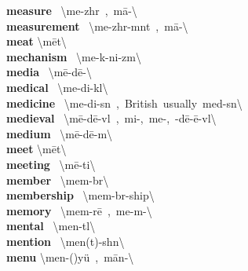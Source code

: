 \documentclass[10pt,a4paper]{article}
\begin{document}
\begin{multicols}{2}
\textbf{ measure }\quad \ \textbackslash \textprimstress me-zh\textschwa r\ ,\ \textprimstress m\={a}-\textbackslash \\
\textbf{ measurement }\quad \ \textbackslash \textprimstress me-zh\textschwa r-m\textschwa nt\ ,\ \textprimstress m\={a}-\textbackslash \\
\textbf{ meat }\quad \textbackslash \textprimstress m\={e}t\textbackslash \\
\textbf{ mechanism }\quad \ \textbackslash \textprimstress me-k\textschwa -\textsecstress ni-z\textschwa m\textbackslash \\
\textbf{ media }\quad \ \textbackslash \textprimstress m\={e}-d\={e}-\textschwa \textbackslash \\
\textbf{ medical }\quad \ \textbackslash \textprimstress me-di-k\textschwa l\textbackslash \\
\textbf{ medicine }\quad \ \textbackslash \textprimstress me-di-s\textschwa n\ ,\ British\ usually\ \textprimstress med-s\textschwa n\textbackslash \\
\textbf{ medieval }\quad \ \textbackslash \textsecstress m\={e}-\textprimstress d\={e}-v\textschwa l\ ,\ mi-,\ \textsecstress me-,\ -d\={e}-\textprimstress \={e}-v\textschwa l\textbackslash \\
\textbf{ medium }\quad \ \textbackslash \textprimstress m\={e}-d\={e}-\textschwa m\textbackslash \\
\textbf{ meet }\quad \textbackslash \textprimstress m\={e}t\textbackslash \\
\textbf{ meeting }\quad \ \textbackslash \textprimstress m\={e}-ti\engma \textbackslash \\
\textbf{ member }\quad \ \textbackslash \textprimstress mem-b\textschwa r\textbackslash \\
\textbf{ membership }\quad \ \textbackslash \textprimstress mem-b\textschwa r-\textsecstress ship\textbackslash \\
\textbf{ memory }\quad \ \textbackslash \textprimstress mem-r\={e}\ ,\ \textprimstress me-m\textschwa -\textbackslash \\
\textbf{ mental }\quad \ \textbackslash \textprimstress men-t\textsuperscript{\textreve}l\textbackslash \\
\textbf{ mention }\quad \ \textbackslash \textprimstress men(t)-sh\textschwa n\textbackslash \\
\textbf{ menu }\quad \textbackslash \textprimstress men-(\textsecstress )y\"{u}\ ,\ \textprimstress m\={a}n-\textbackslash \\

\end{multicols}
\end{document}
